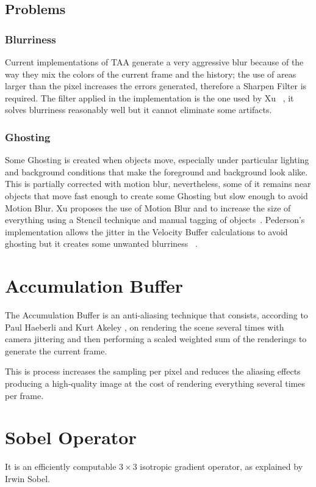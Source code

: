 \documentclass{cslthse-msc}
\begin{document}
\subsection{Problems}
\subsubsection{Blurriness} 
Current implementations of TAA generate a very aggressive blur because of the way they mix the colors of the current frame and the history; the use of areas larger than the pixel increases the errors generated, therefore a Sharpen Filter is required. The filter applied in the implementation is the one used by Xu ~\cite{XU2016}, it solves blurriness reasonably well but it cannot eliminate some artifacts. 

\subsubsection{Ghosting} 
Some Ghosting is created when objects move, especially under particular lighting and background conditions that make the foreground and background look alike. This is partially corrected with motion blur, nevertheless, some of it remains near objects that move fast enough to create some Ghosting but slow enough to avoid Motion Blur. Xu proposes the use of Motion Blur and to increase the size of everything using a Stencil technique and manual tagging of objects~\cite{XU2016}. Pederson's implementation allows the jitter in the Velocity Buffer calculations to avoid ghosting but it creates some unwanted blurriness ~\cite{Fuglsand2016}. 

\section{Accumulation Buffer}
The Accumulation Buffer is an anti-aliasing technique that consists, according to Paul Haeberli and Kurt Akeley \cite{Haeberli1990}, on rendering the scene several times with camera jittering and then performing a scaled weighted sum of the renderings to generate the current frame.

This is process increases the sampling per pixel and reduces the aliasing effects producing a high-quality image at the cost of rendering everything several times per frame.

\section{Sobel Operator}
It is an efficiently computable $3\times 3$ isotropic gradient operator, as explained by Irwin Sobel. \cite{Sobel2014}
\end{document}
